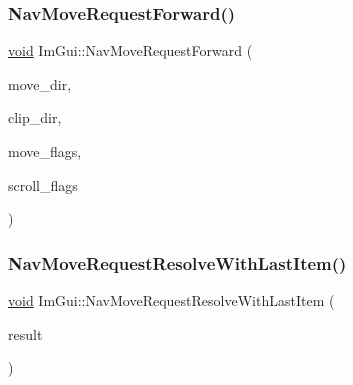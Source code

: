 \mbox{\label{namespaceImGui_a25bbd21bce9d49b94168d5b5773558c3}} 
\subsubsection{\texorpdfstring{Nav\+Move\+Request\+Forward()}{NavMoveRequestForward()}}
{\footnotesize\ttfamily \hyperlink{imgui__impl__opengl3__loader_8h_ac668e7cffd9e2e9cfee428b9b2f34fa7}{void} Im\+Gui\+::\+Nav\+Move\+Request\+Forward (\begin{DoxyParamCaption}\item[{Im\+Gui\+Dir}]{move\+\_\+dir,  }\item[{Im\+Gui\+Dir}]{clip\+\_\+dir,  }\item[{\hyperlink{imgui__internal_8h_aff7a453b89555bb074f2fe46a159ac25}{Im\+Gui\+Nav\+Move\+Flags}}]{move\+\_\+flags,  }\item[{\hyperlink{imgui__internal_8h_a3c23ec9366e4bede0fedb065a79dcbc1}{Im\+Gui\+Scroll\+Flags}}]{scroll\+\_\+flags }\end{DoxyParamCaption})}

\mbox{\label{namespaceImGui_ad71eb039682bb8e3bb950c67eeec4ed8}} 
\subsubsection{\texorpdfstring{Nav\+Move\+Request\+Resolve\+With\+Last\+Item()}{NavMoveRequestResolveWithLastItem()}}
{\footnotesize\ttfamily \hyperlink{imgui__impl__opengl3__loader_8h_ac668e7cffd9e2e9cfee428b9b2f34fa7}{void} Im\+Gui\+::\+Nav\+Move\+Request\+Resolve\+With\+Last\+Item (\begin{DoxyParamCaption}\item[{\hyperlink{structImGuiNavItemData}{Im\+Gui\+Nav\+Item\+Data} $\ast$}]{result }\end{DoxyParamCaption})}

\mbox{\label{namespaceImGui_aaab3763774b822dca0070fa76924d3ef}} 
